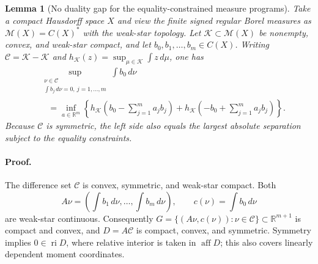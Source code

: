 \documentclass[10pt,twocolumn]{article}
\newtheorem{lemma}{Lemma}
\begin{document}
\begin{lemma}[No duality gap for the equality-constrained measure programs]
\label{si:lem:measure-duality}
Take a compact Hausdorff space $X$ and view the finite signed regular Borel
measures as $\mathcal M(X)=C(X)^*$ with the weak-star topology. Let
$\mathcal K\subset\mathcal M(X)$ be nonempty, convex, and weak-star compact,
and let $b_0,b_1,\ldots,b_m\in C(X)$.
Writing $\mathcal C=\mathcal K-\mathcal K$ and
$h_{\mathcal K}(z)=\sup_{\mu\in\mathcal K}\int z\,d\mu$, one has
\begin{align}
&\sup_{\substack{\nu\in\mathcal C\\
\int b_j\,d\nu=0,\ j=1,\ldots,m}}
\int b_0\,d\nu \nonumber\\
&\quad=\inf_{a\in\mathbb R^m}
\left\{h_{\mathcal K}\!\left(b_0-\sum_{j=1}^ma_jb_j\right)
+h_{\mathcal K}\!\left(-b_0+\sum_{j=1}^ma_jb_j\right)\right\}.
\label{si:eq:measure-duality-lemma}
\end{align}
Because $\mathcal C$ is symmetric, the left side also equals the largest
absolute separation subject to the equality constraints.
\end{lemma}

\paragraph{Proof.}
The difference set $\mathcal C$ is convex, symmetric, and weak-star compact.
Both
\begin{equation*}
A\nu=\left(\int b_1\,d\nu,\ldots,\int b_m\,d\nu\right),
\qquad c(\nu)=\int b_0\,d\nu
\end{equation*}
are weak-star continuous. Consequently
$G=\{(A\nu,c(\nu)):\nu\in\mathcal C\}\subset\mathbb R^{m+1}$ is compact and
convex, and $D=A\mathcal C$ is compact, convex, and symmetric. Symmetry implies
$0\in\operatorname{ri}D$, where relative interior is taken in
$\operatorname{aff}D$; this also covers linearly dependent moment coordinates.
\end{document}
